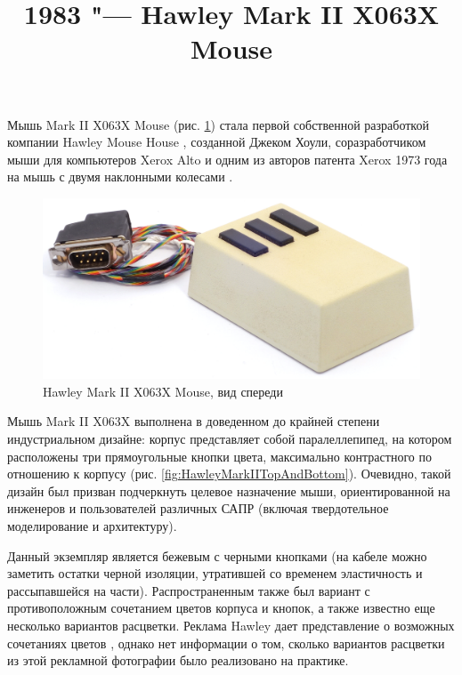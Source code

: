 \documentclass[11pt, a4paper]{article}
\begin{document}
\title{1983 "--- Hawley Mark II X063X Mouse}
\date{}
\maketitle

Мышь Mark II X063X Mouse (рис. \ref{fig:HawleyMarkIIPic}) стала первой собственной разработкой компании Hawley Mouse House \cite{hawley,mouses}, созданной Джеком Хоули, соразработчиком мыши для компьютеров Xerox Alto и одним из авторов патента Xerox 1973 года на мышь с двумя наклонными колесами \cite{pat}.

\begin{figure}[h]
   \centering
    \includegraphics[scale=0.6]{1983_hawley_mark_ii/pic_60.jpg}
    \caption{Hawley Mark II X063X Mouse, вид спереди}
    \label{fig:HawleyMarkIIPic}
\end{figure}

Мышь Mark II X063X выполнена в доведенном до крайней степени индустриальном дизайне: корпус представляет собой паралеллепипед, на котором расположены три прямоугольные кнопки цвета, максимально контрастного по отношению к корпусу (рис. \ref{fig:HawleyMarkIITopAndBottom}). Очевидно, такой дизайн был призван подчеркнуть целевое назначение мыши, ориентированной на инженеров и пользователей различных САПР (включая твердотельное моделирование и архитектуру).

Данный экземпляр является бежевым с черными кнопками (на кабеле можно заметить остатки черной изоляции, утратившей со временем эластичность и рассыпавшейся на части). Распространенным также был вариант с противоположным сочетанием цветов корпуса и кнопок, а также известно еще несколько вариантов расцветки. Реклама Hawley дает представление о возможных сочетаниях цветов \cite{brochure}, однако нет информации о том, сколько вариантов расцветки из этой рекламной фотографии было реализовано на практике.
\end{document}
